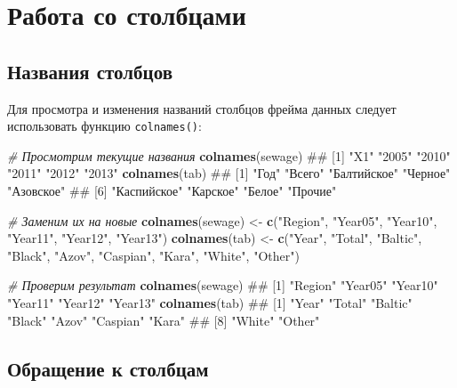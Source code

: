 \documentclass[]{book}
\newenvironment{Shaded}{\begin{snugshade}}{\end{snugshade}}
\newcommand{\KeywordTok}[1]{\textcolor[rgb]{0.13,0.29,0.53}{\textbf{#1}}}
\newcommand{\StringTok}[1]{\textcolor[rgb]{0.31,0.60,0.02}{#1}}
\newcommand{\CommentTok}[1]{\textcolor[rgb]{0.56,0.35,0.01}{\textit{#1}}}
\newcommand{\NormalTok}[1]{#1}
\begin{document}
\section{Работа со столбцами}\label{working_with_columns}

\subsection{Названия столбцов}\label{colnames}

Для просмотра и изменения названий столбцов фрейма данных следует
использовать функцию \texttt{colnames()}:

\begin{Shaded}
\begin{Highlighting}[]
\CommentTok{# Просмотрим текущие названия}
\KeywordTok{colnames}\NormalTok{(sewage)}
\NormalTok{## [1] "X1"   "2005" "2010" "2011" "2012" "2013"}
\KeywordTok{colnames}\NormalTok{(tab)}
\NormalTok{## [1] "Год"        "Всего"      "Балтийское" "Черное"     "Азовское"  }
\NormalTok{## [6] "Каспийское" "Карское"    "Белое"      "Прочие"}

\CommentTok{# Заменим их на новые}
\KeywordTok{colnames}\NormalTok{(sewage) <-}\StringTok{ }\KeywordTok{c}\NormalTok{(}\StringTok{"Region"}\NormalTok{, }\StringTok{"Year05"}\NormalTok{, }\StringTok{"Year10"}\NormalTok{, }\StringTok{"Year11"}\NormalTok{, }\StringTok{"Year12"}\NormalTok{, }\StringTok{"Year13"}\NormalTok{)}
\KeywordTok{colnames}\NormalTok{(tab) <-}\StringTok{ }\KeywordTok{c}\NormalTok{(}\StringTok{"Year"}\NormalTok{, }\StringTok{"Total"}\NormalTok{, }\StringTok{"Baltic"}\NormalTok{, }\StringTok{"Black"}\NormalTok{, }\StringTok{"Azov"}\NormalTok{, }\StringTok{"Caspian"}\NormalTok{, }\StringTok{"Kara"}\NormalTok{, }\StringTok{"White"}\NormalTok{, }\StringTok{"Other"}\NormalTok{)}

\CommentTok{# Проверим результат}
\KeywordTok{colnames}\NormalTok{(sewage)}
\NormalTok{## [1] "Region" "Year05" "Year10" "Year11" "Year12" "Year13"}
\KeywordTok{colnames}\NormalTok{(tab)}
\NormalTok{## [1] "Year"    "Total"   "Baltic"  "Black"   "Azov"    "Caspian" "Kara"   }
\NormalTok{## [8] "White"   "Other"}
\end{Highlighting}
\end{Shaded}

\subsection{Обращение к столбцам}\label{col_calling}
\end{document}
